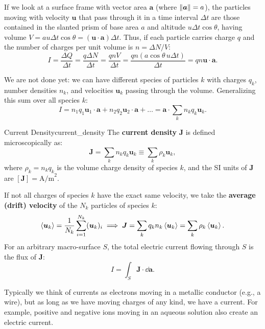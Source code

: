 If we look at a surface frame with vector area $\bm{a}$ (where $\norm{\bm{a}} = a$), the particles moving with velocity $\bm{u}$ that pass through it in a time interval $\Delta t$ are those contained in the slanted prism of base area $a$ and altitude $u \Delta t \cos\theta$, having volume $V = a u \Delta t \cos\theta = (\bm{u} \cdot \bm{a}) \Delta t$. Thus, if each particle carries charge $q$ and the number of charges per unit volume is $n = \Delta N / V$:
\begin{equation}
    I = \frac{\Delta Q}{\Delta t} = \frac{q \Delta N}{\Delta t} = \frac{q n V}{\Delta t} = \frac{q n (a \cos\theta \, u \Delta t)}{\Delta t} = q n \bm{u} \cdot \bm{a}.
\end{equation}

We are not done yet: we can have different species of particles $k$ with charges $q_k$, number densities $n_k$, and velocities $\bm{u}_k$ passing through the volume. Generalizing this sum over all species $k$:
\begin{equation}
    I = n_1 q_1 \bm{u}_1 \cdot \bm{a} + n_2 q_2 \bm{u}_2 \cdot \bm{a} + \dots = \bm{a} \cdot \sum_k n_k q_k \bm{u}_k.
\end{equation}

\begin{definition}{Current Density}{current_density}
The \textbf{current density} $\bm{J}$ is defined microscopically as:
\begin{equation}
    \bm{J} = \sum_k n_k q_k \bm{u}_k \equiv \sum_k \rho_k \bm{u}_k,
\end{equation}
where $\rho_k = n_k q_k$ is the volume charge density of species $k$, and the SI units of $\bm{J}$ are $[\bm{J}] = \text{A/m}^2$.

If not all charges of species $k$ have the exact same velocity, we take the \textbf{average (drift) velocity} of the $N_k$ particles of species $k$:
\begin{equation}
    \ev{\bm{u}_k} = \frac{1}{N_k} \sum_{i=1}^{N_k} (\bm{u}_k)_i \implies \bm{J} = \sum_k q_k n_k \ev{\bm{u}_k} = \sum_k \rho_k \ev{\bm{u}_k}.
\end{equation}
For an arbitrary macro-surface $S$, the total electric current flowing through $S$ is the flux of $\bm{J}$:
\begin{equation}
    I = \int_S \bm{J} \cdot \dd{\bm{a}}.
\end{equation}
\end{definition}

\begin{remark}
Typically we think of currents as electrons moving in a metallic conductor (e.g., a wire), but as long as we have moving charges of any kind, we have a current. For example, positive and negative ions moving in an aqueous solution also create an electric current.
\end{remark}

